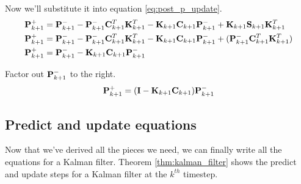 Now we'll substitute it into equation \eqref{eq:post_p_update}.
\begin{align*}
  \mathbf{P}_{k+1}^+ &=
    \mathbf{P}_{k+1}^- - \mathbf{P}_{k+1}^-\mathbf{C}_{k+1}^T\mathbf{K}_{k+1}^T -
    \mathbf{K}_{k+1}\mathbf{C}_{k+1}\mathbf{P}_{k+1}^- +
    \mathbf{K}_{k+1}\mathbf{S}_{k+1}\mathbf{K}_{k+1}^T \\
  \mathbf{P}_{k+1}^+ &=
    \mathbf{P}_{k+1}^- - \mathbf{P}_{k+1}^-\mathbf{C}_{k+1}^T\mathbf{K}_{k+1}^T -
    \mathbf{K}_{k+1}\mathbf{C}_{k+1}\mathbf{P}_{k+1}^- +
    (\mathbf{P}_{k+1}^-\mathbf{C}_{k+1}^T\mathbf{K}_{k+1}^T) \\
  \mathbf{P}_{k+1}^+ &=
    \mathbf{P}_{k+1}^- - \mathbf{K}_{k+1}\mathbf{C}_{k+1}\mathbf{P}_{k+1}^-
\end{align*}

Factor out $\mathbf{P}_{k+1}^-$ to the right.
\begin{equation*}
  \mathbf{P}_{k+1}^+ = (\mathbf{I} - \mathbf{K}_{k+1}\mathbf{C}_{k+1})\mathbf{P}_{k+1}^-
\end{equation*}

\subsection{Predict and update equations}

Now that we've derived all the pieces we need, we can finally write all the
equations for a Kalman filter. Theorem \ref{thm:kalman_filter} shows the predict
and update steps for a Kalman filter at the $k^{th}$ timestep.

